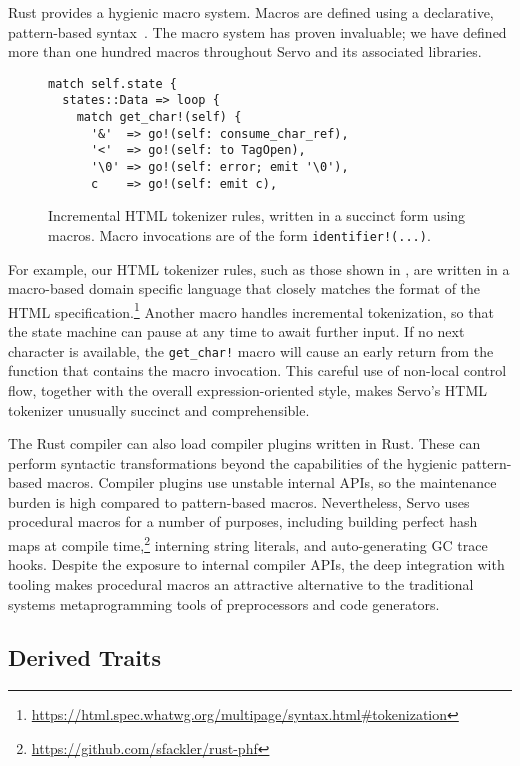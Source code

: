 Rust provides a hygienic macro system. Macros are defined using a declarative, pattern-based syntax~\cite{Kohlbecker:1987:MDS:41625.41632}. The macro system has proven invaluable; we have defined more than one hundred macros throughout Servo and its associated libraries.

\begin{figure}
\begin{lstlisting}
match self.state {
  states::Data => loop {
    match get_char!(self) {
      '&'  => go!(self: consume_char_ref),
      '<'  => go!(self: to TagOpen),
      '\0' => go!(self: error; emit '\0'),
      c    => go!(self: emit c),
\end{lstlisting}
  \caption{Incremental HTML tokenizer rules, written in a succinct form using macros. Macro invocations are of the form \lstinline{identifier!(...)}.}
  \label{fig:tokenizer-macros}
\end{figure}

For example, our HTML tokenizer rules, such as those shown in , are written in a macro-based domain specific language that closely matches the format of the HTML specification.\footnote{\url{https://html.spec.whatwg.org/multipage/syntax.html#tokenization}} Another macro handles incremental tokenization, so that the state machine can pause at any time to await further input. If no next character is available, the \lstinline{get_char!} macro will cause an early return from the function that contains the macro invocation. This careful use of non-local control flow, together with the overall expression-oriented style, makes Servo's HTML tokenizer unusually succinct and comprehensible.

The Rust compiler can also load compiler plugins written in Rust. These can perform syntactic transformations beyond the capabilities of the hygienic pattern-based macros. Compiler plugins use unstable internal APIs, so the maintenance burden is high compared to pattern-based macros. Nevertheless, Servo uses procedural macros for a number of purposes, including building perfect hash maps at compile time,\footnote{\url{https://github.com/sfackler/rust-phf}} interning string literals, and auto-generating GC trace hooks. Despite the exposure to internal compiler APIs, the deep integration with tooling makes procedural macros an attractive alternative to the traditional systems metaprogramming tools of preprocessors and code generators.

\subsection{Derived Traits}

